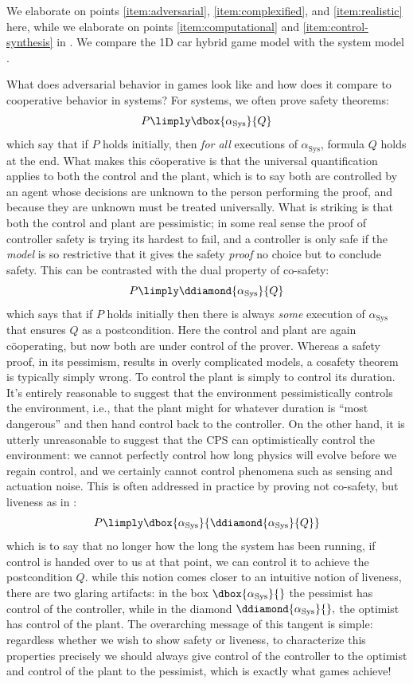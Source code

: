\documentclass[12pt]{cmuthesis}
\theoremstyle{definition}
\theoremstyle{remark}
\newcommand{\rref}[2][]{\prettyref{#2}}
\begin{document}
We elaborate on points \ref{item:adversarial}, \ref{item:complexified}, and \ref{item:realistic} here, while we elaborate on points \ref{item:computational} and \ref{item:control-synthesis} in \rref{ch:proofplex}.
We compare the 1D car hybrid game model \rref{ex:driving-game} with the system model \rref{ex:driving-system}.

\newcommand{\gameex}{\alpha_{\times}\xspace}
\newcommand{\sysex}{\alpha_{\text{Sys}}\xspace}
What does adversarial behavior in games look like and how does it compare to cooperative behavior in systems?
For systems, we often prove safety theorems:
\[P \limply \dbox{\sysex}{Q}\]
which say that if $P$ holds initially, then \emph{for all} executions of $\sysex$, formula $Q$ holds at the end.
What makes this c\"ooperative is that the universal quantification applies to both the control and the plant, which is to say both are controlled by an agent whose decisions are unknown to the person performing the proof, and because they are unknown must be treated universally.
What is striking is that both the control and plant are pessimistic; in some real sense the proof of controller safety is trying its hardest to fail, and a controller is only safe if the \emph{model} is so restrictive  that it gives the safety \emph{proof} no choice but to conclude safety.
This can be contrasted with the dual property of co-safety:
\[P \limply \ddiamond{\sysex}{Q}\]
which says that if $P$ holds initially then there is always \emph{some} execution of $\sysex$ that ensures $Q$ as a postcondition.
Here the control and plant are again c\"ooperating, but now both are under control of the prover.
Whereas a safety proof, in its pessimism, results in overly complicated models, a cosafety theorem is typically simply wrong.
To control the plant is simply to control its duration.
It's entirely reasonable to suggest that the environment pessimistically controls the environment, i.e.,  that the plant might for whatever duration is ``most dangerous'' and then hand control back to the controller.
On the other hand, it is utterly unreasonable to suggest that the CPS can optimistically control the environment: we cannot perfectly control how long physics will evolve before we regain control, and we certainly cannot control phenomena such as sensing and actuation noise.
This is often addressed in practice by proving not co-safety, but liveness as in \rref{thm:liveness}:
\[P \limply \dbox{\sysex}{\ddiamond{\sysex}{Q}}\]
which is to say that no longer how the long the system has been running, if control is handed over to us at that point, we can control it to achieve the postcondition $Q$.
while this notion comes closer to an intuitive notion of liveness, there are two glaring artifacts: in the box $\dbox{\sysex}{}$ the pessimist has control of the controller, while in the diamond $\ddiamond{\sysex}{},$ the optimist has control of the plant.
The overarching message of this tangent is simple: regardless whether we wish to show safety or liveness, to characterize this properties precisely we should always give control of the controller to the optimist and control of the plant to the pessimist, which is exactly what games achieve!
\end{document}

